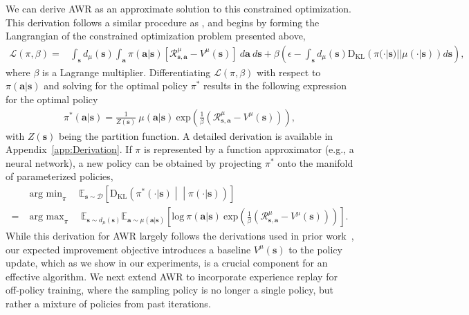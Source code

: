 \documentclass{article} \usepackage{iclr2020_conference,times}
\def\rva{{\mathbf{a}}}
\def\rvs{{\mathbf{s}}}
\newcommand{\expec}{\mathbb{E}}
\begin{document}
We can derive AWR as an approximate solution to this constrained optimization. This derivation follows a similar procedure as \citet{Peters2010REP},
and begins by forming the Langrangian of the constrained optimization problem presented above,
\begin{equation}
 \begin{aligned}
     \mathcal{L}(\pi, \beta) = & \int_\rvs d_\mu(\rvs) \int_\rva \pi(\rva | \rvs) \left[\mathcal{R}_{\rvs,\rva}^\mu - V^\mu(\rvs)\right] \ d\rva \ d\rvs + \beta \left(\epsilon - \int_\rvs d_\mu(\rvs) \mathrm{D_{KL}} \left( \pi(\cdot |\rvs) || \mu(\cdot |\rvs) \right) d\rvs \right) ,
\label{eqn:AWRLagrangian}
 \end{aligned}
 \end{equation}
where $\beta$ is a Lagrange multiplier. Differentiating $\mathcal{L}(\pi, \beta)$
with respect to $\pi(\rva|\rvs)$ and solving for the optimal policy $\pi^*$ results in the following expression for the optimal policy
\begin{equation}
 \begin{aligned}
     \pi^*(\rva|\rvs) = \frac{1}{Z(\rvs)} \ \mu(\rva|\rvs) \ \mathrm{exp}\left(\frac{1}{\beta}\left( \mathcal{R}_{\rvs,\rva}^\mu - V^\mu(\rvs) \right) \right) ,
 \end{aligned}
\end{equation}
with $Z(\rvs)$ being the partition function. A detailed derivation is available in Appendix~\ref{app:Derivation}. If $\pi$ is represented by a function approximator (e.g., a neural network), a new policy can be obtained by projecting $\pi^*$ onto the manifold of parameterized policies,
\begin{align}
    & \mathop{\mathrm{arg \ min}}_{\pi} \quad \mathbb{E}_{\rvs \sim \mathcal{D}} \left[ \mathrm{D_{KL}} \left(\pi^*(\cdot  | \rvs) \middle|\middle| \pi(\cdot  | \rvs)\right) \right]\\
    = & \mathop{\mathrm{arg \ max}}_{\pi} \quad \expec_{\rvs \sim d_\mu(\rvs)} \expec_{\rva \sim \mu(\rva|\rvs)} \left[ \mathrm{log} \ \pi(\rva | \rvs) \ \mathrm{exp}\left( \frac{1}{\beta} \left( \mathcal{R}_{\rvs,\rva}^\mu - V^\mu(\rvs) \right) \right) \right].
\label{eqn:AWRUpdate}
\end{align}
While this derivation for AWR largely follows the derivations used in prior work~\citep{Peters2010REP,abdolmaleki2018maximum}, our expected improvement objective introduces a baseline $V^\mu(\rvs)$ to the policy update, which as we show in our experiments, is a crucial component for an effective algorithm. We next extend AWR to incorporate experience replay for off-policy training, where the sampling policy is no longer a single policy, but rather a mixture of policies from past iterations.
\end{document}
